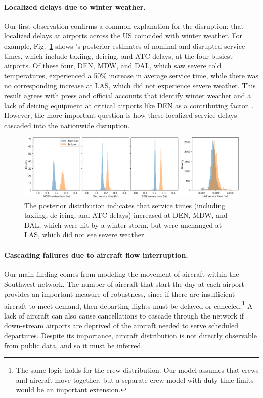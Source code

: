 \paragraph{Localized delays due to winter weather.} Our first observation confirms a common explanation for the disruption: that localized delays at airports across the US coincided with winter weather. For example, Fig.~\ref{ch:icml:fig:wn_service_times} shows \ouralg{}'s posterior estimates of nominal and disrupted service times, which include taxiing, deicing, and ATC delays, at the four busiest airports. Of these four, DEN, MDW, and DAL, which saw severe cold temperatures, experienced a 50\% increase in average service time, while there was no corresponding increase at LAS, which did not experience severe weather.
%
This result agrees with press and official accounts that identify winter weather and a lack of deicing equipment at critical airports like DEN as a contributing factor~\cite{southwestairlinesFinalSummaryAction2023,cramerWhatCausedChaos2022}. However, the more important question is how these localized service delays cascaded into the nationwide disruption.

\begin{figure}[t]
    \centering
    \includegraphics[width=\linewidth]{images/icml/wn/wn_top4_service_times.pdf}
    \caption{The posterior distribution indicates that service times (including taxiing, de-icing, and ATC delays) increased at DEN, MDW, and DAL, which were hit by a winter storm, but were unchanged at LAS, which did not see severe weather.}
    \label{ch:icml:fig:wn_service_times}
\end{figure}

\paragraph{Cascading failures due to aircraft flow interruption.}
%
Our main finding comes from modeling the movement of aircraft within the Southwest network. The number of aircraft that start the day at each airport provides an important measure of robustness, since if there are insufficient aircraft to meet demand, then departing flights must be delayed or canceled.\footnote{The same logic holds for the crew distribution. Our model assumes that crews and aircraft move together, but a separate crew model with duty time limits would be an important extension.} A lack of aircraft can also cause cancellations to cascade through the network if down-stream airports are deprived of the aircraft needed to serve scheduled departures. Despite its importance, aircraft distribution is not directly observable from public data, and so it must be inferred.

